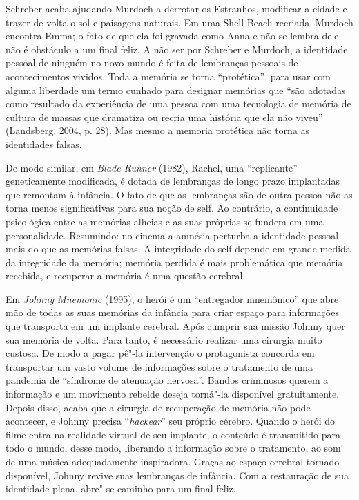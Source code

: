 Schreber acaba ajudando Murdoch a derrotar os Estranhos, modificar a
cidade e trazer de volta o sol e paisagens naturais. Em uma Shell Beach
recriada, Murdoch encontra Emma; o fato de que ela foi gravada como Anna
e não se lembra dele não é obstáculo a um final feliz. A não ser por
Schreber e Murdoch, a identidade pessoal de ninguém no novo mundo é
feita de lembranças pessoais de acontecimentos vividos. Toda a memória
se torna ``protética'', para usar com alguma liberdade um termo cunhado
para designar memórias que ``são adotadas como resultado da experiência
de uma pessoa com uma tecnologia de memória de cultura de massas que
dramatiza ou recria uma história que ela não viveu'' (Landsberg, 2004,
p. 28). Mas mesmo a memoria protética não torna as identidades falsas.

De modo similar, em \emph{Blade Runner} (1982), Rachel, uma
``replicante'' geneticamente modificada, é dotada de lembranças de longo
prazo implantadas que remontam à infância. O fato de que as lembranças
são de outra pessoa não as torna menos significativas para sua noção de
self. Ao contrário, a continuidade psicológica entre as memórias alheias
e as suas próprias se fundem em uma personalidade. Resumindo: no cinema
a amnésia perturba a identidade pessoal mais do que as memórias falsas.
A integridade do self depende em grande medida da integridade da
memória; memória perdida é mais problemática que memória recebida, e
recuperar a memória é uma questão cerebral.

Em \emph{Johnny Mnemonic} (1995), o herói é um ``entregador mnemônico''
que abre mão de todas as suas memórias da infância para criar espaço
para informações que transporta em um implante cerebral. Após cumprir
sua missão Johnny quer sua memória de volta. Para tanto, é necessário
realizar uma cirurgia muito custosa. De modo a pagar pê"-la intervenção o
protagonista concorda em transportar um vasto volume de informações
sobre o tratamento de uma pandemia de ``síndrome de atenuação nervosa''.
Bandos criminosos querem a informação e um movimento rebelde deseja
torná"-la disponível gratuitamente. Depois disso, acaba que a cirurgia de
recuperação de memória não pode acontecer, e Johnny precisa
``\emph{hackear}'' seu próprio cérebro. Quando o herói do filme entra na
realidade virtual de seu implante, o conteúdo é transmitido para todo o
mundo, desse modo, liberando a informação sobre o tratamento, ao som de
uma música adequadamente inspiradora. Graças ao espaço cerebral tornado
disponível, Johnny revive suas lembranças de infância. Com a restauração
de sua identidade plena, abre"-se caminho para um final feliz.

